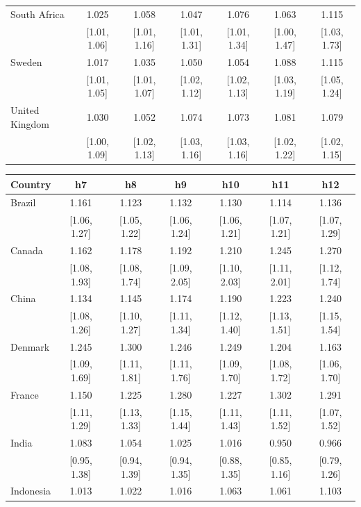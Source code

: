 \begin{table}[htbp]
{\begin{tabular*}{\textwidth}{@{\extracolsep{\fill}}lcccccc}
\addlinespace
South Africa & 1.025 & 1.058 & 1.047 & 1.076 & 1.063 & 1.115 \\
 & [1.01, 1.06] & [1.01, 1.16] & [1.01, 1.31] & [1.01, 1.34] & [1.00, 1.47] & [1.03, 1.73] \\
\addlinespace
Sweden & 1.017 & 1.035 & 1.050 & 1.054 & 1.088 & 1.115 \\
 & [1.01, 1.05] & [1.01, 1.07] & [1.02, 1.12] & [1.02, 1.13] & [1.03, 1.19] & [1.05, 1.24] \\
\addlinespace
United Kingdom & 1.030 & 1.052 & 1.074 & 1.073 & 1.081 & 1.079 \\
 & [1.00, 1.09] & [1.02, 1.13] & [1.03, 1.16] & [1.03, 1.16] & [1.02, 1.22] & [1.02, 1.15] \\
\bottomrule
\end{tabular*}

\vspace{6pt}
\begin{tabular*}{\textwidth}{@{\extracolsep{\fill}}lcccccc}
\toprule
Country & h7 & h8 & h9 & h10 & h11 & h12 \\
\midrule
Brazil & 1.161 & 1.123 & 1.132 & 1.130 & 1.114 & 1.136 \\
 & [1.06, 1.27] & [1.05, 1.22] & [1.06, 1.24] & [1.06, 1.21] & [1.07, 1.21] & [1.07, 1.29] \\
\addlinespace
Canada & 1.162 & 1.178 & 1.192 & 1.210 & 1.245 & 1.270 \\
 & [1.08, 1.93] & [1.08, 1.74] & [1.09, 2.05] & [1.10, 2.03] & [1.11, 2.01] & [1.12, 1.74] \\
\addlinespace
China & 1.134 & 1.145 & 1.174 & 1.190 & 1.223 & 1.240 \\
 & [1.08, 1.26] & [1.10, 1.27] & [1.11, 1.34] & [1.12, 1.40] & [1.13, 1.51] & [1.15, 1.54] \\
\addlinespace
Denmark & 1.245 & 1.300 & 1.246 & 1.249 & 1.204 & 1.163 \\
 & [1.09, 1.69] & [1.11, 1.81] & [1.11, 1.76] & [1.09, 1.70] & [1.08, 1.72] & [1.06, 1.70] \\
\addlinespace
France & 1.150 & 1.225 & 1.280 & 1.227 & 1.302 & 1.291 \\
 & [1.11, 1.29] & [1.13, 1.33] & [1.15, 1.44] & [1.11, 1.43] & [1.11, 1.52] & [1.07, 1.52] \\
\addlinespace
India & 1.083 & 1.054 & 1.025 & 1.016 & 0.950 & 0.966 \\
 & [0.95, 1.38] & [0.94, 1.39] & [0.94, 1.35] & [0.88, 1.35] & [0.85, 1.16] & [0.79, 1.26] \\
\addlinespace
Indonesia & 1.013 & 1.022 & 1.016 & 1.063 & 1.061 & 1.103 \\

\end{tabular*}}
\end{table}
